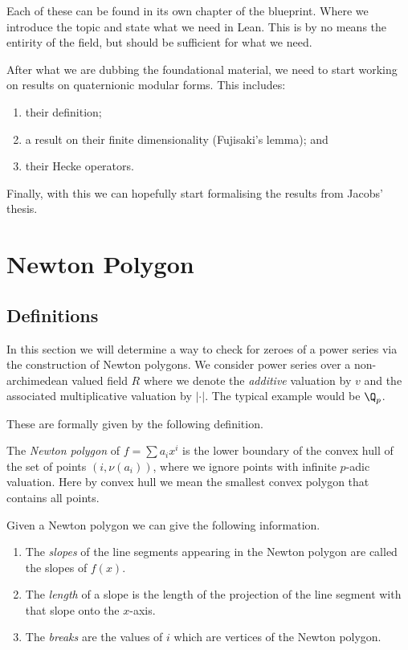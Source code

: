 Each of these can be found in its own chapter of the blueprint. Where we introduce the topic and
state what we need in Lean. This is by no means the entirity of the field, but should be sufficient
for what we need.

After what we are dubbing the foundational material, we need to start working on results on
quaternionic modular forms. This includes:
\begin{enumerate}
  \item their definition;
  \item a result on their finite dimensionality (Fujisaki's lemma); and
  \item their Hecke operators.
\end{enumerate}

Finally, with this we can hopefully start formalising the results from Jacobs' thesis.


\chapter{Newton Polygon}

\section{Definitions}

In this section we will determine a way to check for zeroes of a power series via the construction
of Newton polygons. We consider power series over a non-archimedean valued field $R$ where we denote
the \emph{additive} valuation by $v$ and the associated multiplicative valuation by $\lvert \cdot \rvert$.
The typical example would be $\Q_p$.

These are formally given by the following definition.

\begin{definition}
    The \emph{Newton polygon} of $f = \sum a_i x^i$ is the lower boundary of the convex hull
    of the set of points $(i,\nu (a_i))$, where we ignore points with infinite $p$-adic valuation.
    Here by convex hull we mean the smallest convex polygon that contains all points.
\end{definition}

Given a Newton polygon we can give the following information.

\begin{definition}
    \begin{enumerate}
        \item The \emph{slopes} of the line segments appearing in the Newton polygon are called the
        slopes of $f(x)$.
        \item The \emph{length} of a slope is the length of the projection of the line segment with
        that slope onto the $x$-axis.
        \item The \emph{breaks} are the values of $i$ which are vertices of the Newton polygon.
    \end{enumerate}
\end{definition}

